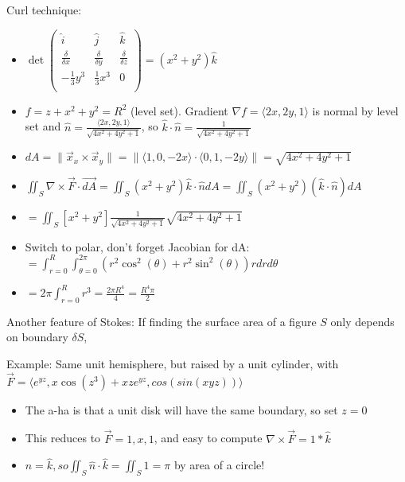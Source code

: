 \documentclass[11pt, oneside]{article}   	%
\begin{document}
Curl technique:
\begin{itemize}
\item $\det\begin{pmatrix}
\hat{i} &\hat{j} &\hat{k}  \\
\frac{\delta}{\delta x} &\frac{\delta}{\delta y} &\frac{\delta}{\delta z}  \\
-\frac{1}{3}y^3& \frac{1}{3}x^3 & 0 \\
\end{pmatrix} = (x^2 + y^2)\hat{k}$
\item $f = z + x^2 + y^2 = R^2$ (level set).  Gradient $\nabla f = \langle 2x, 2y, 1\rangle$ is normal by level set and $\hat{n} = \frac{\langle 2x, 2y, 1\rangle}{\sqrt{4x^2 + 4y^2 + 1}}$, so $\hat{k} \cdot \hat{n}  = \frac{1}{\sqrt{4x^2 + 4y^2 + 1}}$
\item $dA = \|\vec{x}_x \times \vec{x}_y\| = \| \langle 1, 0, -2x \rangle \cdot \langle 0, 1, -2y \rangle \| = \sqrt{4x^2 + 4y^2 + 1}$
\item $\iint_S \nabla \times \vec{F} \cdot \vec{dA} = \iint_S (x^2 + y^2)\hat{k}\cdot\hat{n}dA = \iint_S (x^2 + y^2)(\hat{k}\cdot\hat{n})dA$
\item $=\iint_S [x^2+y^2]\frac{1}{ \sqrt{4x^2 + 4y^2 + 1}}  \sqrt{4x^2 + 4y^2 + 1}$
\item Switch to polar, don't forget Jacobian for dA: $=\int_{r=0}^R\int_{\theta = 0}^{2\pi} (r^2\cos^2(\theta)+ r^2\sin^2(\theta))r dr d\theta$
\item $ = 2\pi \int_{r=0}^R r^3 = \frac{2\pi R^4}{4} = \frac{R^4\pi}{2}$
\end{itemize}

Another feature of Stokes: If finding the surface area of a figure $S$ only depends on boundary $\delta S$, 

Example: Same unit hemisphere, but raised by a unit cylinder, with $\vec{F} = \langle e^{yz}, x\cos(z^3) + xze^{yz}, cos(sin(xyz)) \rangle$
\begin{itemize}
\item The a-ha is that a unit disk will have the same boundary, so set $z=0$
\item This reduces to $\vec{F} = 1, x, 1$, and easy to compute $\nabla \times \vec{F} = 1 * \hat{k}$
\item $\hat{n} = \hat{k}, so \iint_S \hat{n} \cdot \hat{k} = \iint_S 1 = \pi$ by area of a circle!
\end{itemize}
\end{document}
